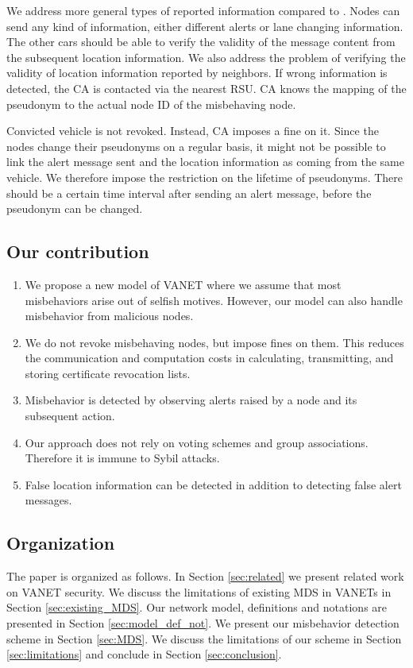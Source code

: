 \documentclass[conference]{IEEEtran}[10pt]
\begin{document}
We address more general types of reported information compared to \cite{GVGKM10}. Nodes can send any kind of information, either different alerts or lane changing information.
The other cars should be able to verify the validity of the message content from the subsequent location information.
We also address the problem of verifying  the validity of location information reported by neighbors. 
If wrong information is detected, the CA is contacted via the nearest RSU.
CA knows the mapping of the pseudonym to the actual node ID of the misbehaving node. 

Convicted vehicle is not revoked. Instead, CA imposes a fine on it.  
Since the nodes change their pseudonyms on a regular basis, it might not be possible
to link the alert message sent and the location information as coming from the same vehicle. 
We therefore impose the restriction on the lifetime of pseudonyms. There should be a certain time interval
after sending an alert message, before the pseudonym can be changed. 

\subsection{Our contribution}
\begin{enumerate}
\item We propose a new model of VANET where we assume that most misbehaviors arise out of selfish motives. However, 
our model can also handle misbehavior from malicious nodes. 
\item We do not revoke misbehaving nodes, but impose fines on them. 
This reduces the communication and computation costs in calculating,  transmitting, and storing  certificate revocation lists. 
\item Misbehavior is detected by observing alerts raised by a node and its subsequent action. 
\item Our approach does not rely on voting schemes and group associations. Therefore it is immune to Sybil attacks.
\item False location information can be detected in addition to detecting false alert messages. 
\end{enumerate} 

\subsection{Organization}
The paper is organized as follows. In Section \ref{sec:related} we present related work on VANET security. 
We discuss the limitations of existing MDS in VANETs in Section \ref{sec:existing_MDS}. 
Our network model, definitions and notations are presented in Section \ref{sec:model_def_not}. 
We present our misbehavior detection scheme in Section \ref{sec:MDS}.
We discuss the limitations of our scheme in Section \ref{sec:limitations} and conclude in Section \ref{sec:conclusion}. 
\end{document}
